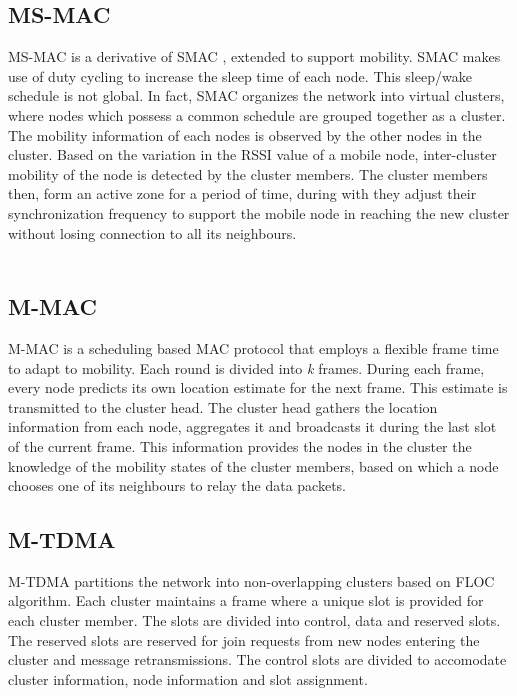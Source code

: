 \documentclass[a4paper, conference, 10pt]{IEEEtran}
\begin{document}
\subsection{MS-MAC}
 MS-MAC \cite{ms-mac} is a derivative of SMAC \cite{smac}, extended to support mobility. SMAC makes use of duty cycling to increase the sleep time of each node. This sleep/wake schedule is not global. In fact, SMAC organizes the network into virtual clusters, where nodes which possess a common schedule are grouped together as a cluster. The mobility information of each nodes is observed by the other nodes in the cluster. Based on the variation in the RSSI value of a mobile node, inter-cluster mobility of the node is detected by the cluster members. The cluster members then, form an active zone for a period of time, during with they adjust their synchronization frequency to support the mobile node in reaching the new cluster without losing connection to all its neighbours. \\\\

\subsection{M-MAC}
M-MAC \cite{m-mac} is a scheduling based MAC protocol that employs a flexible frame time to adapt to mobility. Each round is divided into \emph{k} frames. During each frame, every node predicts its own location estimate for the next frame. This estimate is transmitted to the cluster head. The cluster head gathers the location information from each node, aggregates it and broadcasts it during the last slot of the current frame. This information provides the nodes in the cluster the knowledge of the mobility states of the cluster members, based on which a node chooses one of its neighbours to relay the data packets.

\subsection{M-TDMA}
M-TDMA \cite{m-tdma} partitions the network into non-overlapping clusters based on FLOC algorithm\cite{floc}. Each cluster maintains a frame where a unique slot is provided for each cluster member. The slots are divided into control, data and reserved slots. The reserved slots are reserved for join requests from new nodes entering the cluster and message retransmissions. The control slots are divided to accomodate cluster information, node information and slot assignment. 
\end{document}
